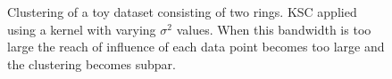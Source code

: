 \begin{figure}[h]
{\begin{minipage}{0.48\textwidth}
\end{minipage}}\\
%
\quad
{}\\
%
\caption{Clustering of a toy dataset consisting of two rings. KSC applied using a kernel with varying $\sigma^2$ values. When this bandwidth is too large the reach of influence of each data point becomes too large and the clustering becomes subpar.}
\label{spectraltoy}
\end{figure}

